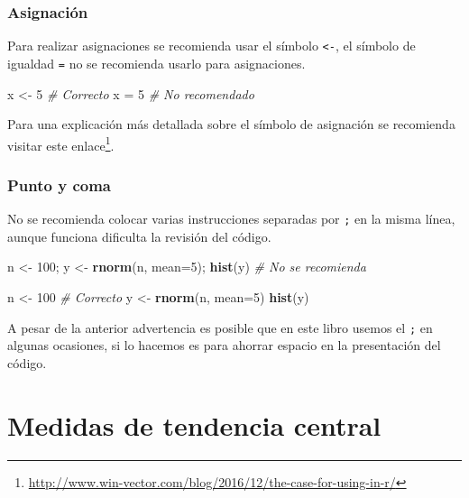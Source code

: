 \documentclass[10pt,]{krantz}
\makeatletter
\newenvironment{Shaded}{\begin{snugshade}}{\end{snugshade}}
\newcommand{\KeywordTok}[1]{\textcolor[rgb]{0.13,0.29,0.53}{\textbf{{#1}}}}
\newcommand{\DataTypeTok}[1]{\textcolor[rgb]{0.13,0.29,0.53}{{#1}}}
\newcommand{\DecValTok}[1]{\textcolor[rgb]{0.00,0.00,0.81}{{#1}}}
\newcommand{\StringTok}[1]{\textcolor[rgb]{0.31,0.60,0.02}{{#1}}}
\newcommand{\CommentTok}[1]{\textcolor[rgb]{0.56,0.35,0.01}{\textit{{#1}}}}
\newcommand{\NormalTok}[1]{{#1}}
\renewcommand{\href}[2]{#2\footnote{\url{#1}}}
\newenvironment{kframe}{%
\medskip{}
\setlength{\fboxsep}{.8em}
 \def\at@end@of@kframe{}%
 \ifinner\ifhmode%
  \def\at@end@of@kframe{\end{minipage}}%
  \begin{minipage}{\columnwidth}%
 \fi\fi%
 \def\FrameCommand##1{\hskip\@totalleftmargin \hskip-\fboxsep
 \colorbox{shadecolor}{##1}\hskip-\fboxsep
     \hskip-\linewidth \hskip-\@totalleftmargin \hskip\columnwidth}%
 \MakeFramed {\advance\hsize-\width
   \@totalleftmargin\z@ \linewidth\hsize
   \@setminipage}}%
 {\par\unskip\endMakeFramed%
 \at@end@of@kframe}
\renewenvironment{Shaded}{\begin{kframe}}{\end{kframe}}
\makeatother
\begin{document}
\subsection{Asignación}

Para realizar asignaciones se recomienda usar el símbolo
\texttt{\textless{}-}, el símbolo de igualdad \texttt{=} no se
recomienda usarlo para asignaciones.

\begin{Shaded}
\begin{Highlighting}[]
\NormalTok{x <-}\StringTok{ }\DecValTok{5}  \CommentTok{# Correcto}
\NormalTok{x =}\StringTok{ }\DecValTok{5}   \CommentTok{# No recomendado}
\end{Highlighting}
\end{Shaded}

Para una explicación más detallada sobre el símbolo de asignación se
recomienda visitar este
\href{http://www.win-vector.com/blog/2016/12/the-case-for-using-in-r/}{enlace}.

\subsection{Punto y coma}

No se recomienda colocar varias instrucciones separadas por \texttt{;}
en la misma línea, aunque funciona dificulta la revisión del código.

\begin{Shaded}
\begin{Highlighting}[]
\NormalTok{n <-}\StringTok{ }\DecValTok{100}\NormalTok{; y <-}\StringTok{ }\KeywordTok{rnorm}\NormalTok{(n, }\DataTypeTok{mean=}\DecValTok{5}\NormalTok{); }\KeywordTok{hist}\NormalTok{(y)  }\CommentTok{# No se recomienda}

\NormalTok{n <-}\StringTok{ }\DecValTok{100}                                  \CommentTok{# Correcto}
\NormalTok{y <-}\StringTok{ }\KeywordTok{rnorm}\NormalTok{(n, }\DataTypeTok{mean=}\DecValTok{5}\NormalTok{)}
\KeywordTok{hist}\NormalTok{(y)}
\end{Highlighting}
\end{Shaded}

A pesar de la anterior advertencia es posible que en este libro usemos
el \texttt{;} en algunas ocasiones, si lo hacemos es para ahorrar
espacio en la presentación del código.

\chapter{\texorpdfstring{Medidas de tendencia central
\label{central}}{Medidas de tendencia central }}\label{medidas-de-tendencia-central}
\end{document}
